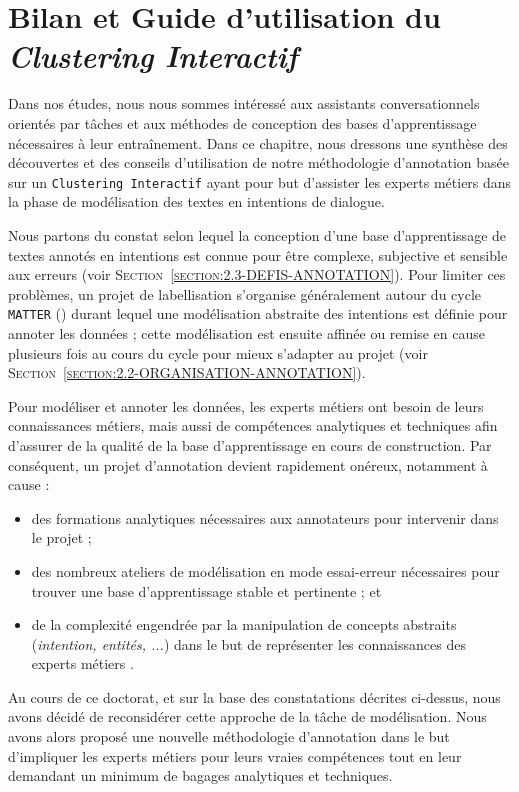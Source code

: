 \chapter{Bilan et Guide d'utilisation du \textit{Clustering Interactif}}
\label{chapter:5-GUIDE}
	
	Dans nos études, nous nous sommes intéressé aux assistants conversationnels orientés par tâches et aux méthodes de conception des bases d'apprentissage nécessaires à leur entraînement.
	Dans ce chapitre, nous dressons une synthèse des découvertes et des conseils d'utilisation de notre méthodologie d'annotation basée sur un \texttt{Clustering Interactif} ayant pour but d'assister les experts métiers dans la phase de modélisation des textes en intentions de dialogue.
	
	\begin{leftBarReminder}
		Nous partons du constat selon lequel la conception d'une base d'apprentissage de textes annotés en intentions est connue pour être complexe, subjective et sensible aux erreurs (voir \textsc{Section~\ref{section:2.3-DEFIS-ANNOTATION}}).
		Pour limiter ces problèmes, un projet de labellisation s'organise généralement autour du cycle \texttt{MATTER} (\cite{pustejovsky-stubbs:2012:natural-language-annotation}) durant lequel une modélisation abstraite des intentions est définie pour annoter les données ; cette modélisation est ensuite affinée ou remise en cause plusieurs fois au cours du cycle pour mieux s'adapter au projet (voir \textsc{Section~\ref{section:2.2-ORGANISATION-ANNOTATION}}).
		
		Pour modéliser et annoter les données, les experts métiers ont besoin de leurs connaissances métiers, mais aussi de compétences analytiques et techniques afin d'assurer de la qualité de la base d'apprentissage en cours de construction.
		Par conséquent, un projet d'annotation devient rapidement onéreux, notamment à cause :
		\begin{itemize}
			\item des formations analytiques nécessaires aux annotateurs pour intervenir dans le projet ;
			\item des nombreux ateliers de modélisation en mode essai-erreur nécessaires pour trouver une base d'apprentissage stable et pertinente ; et
			\item de la complexité engendrée par la manipulation de concepts abstraits (\textit{intention, entités, ...}) dans le but de représenter les connaissances des experts métiers .
		\end{itemize}
		
		Au cours de ce doctorat, et sur la base des constatations décrites ci-dessus, nous avons décidé de reconsidérer cette approche de la tâche de modélisation.
		Nous avons alors proposé une nouvelle méthodologie d'annotation dans le but d'impliquer les experts métiers pour leurs vraies compétences tout en leur demandant un minimum de bagages analytiques et techniques.
	\end{leftBarReminder}
	
